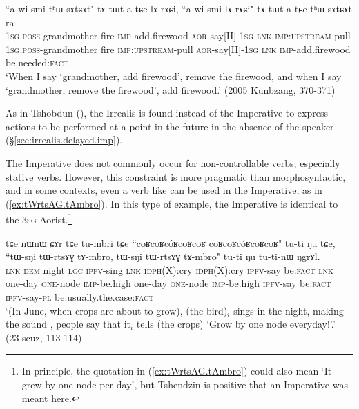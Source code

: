 \begin{exe}
\ex \label{ex:thWsAtCAt.lArACi}
\gll ``a-wi smi tʰɯ-sɤtɕɤt" tɤ-tɯt-a tɕe lɤ-rɤɕi, ``a-wi smi lɤ-rɤɕi" tɤ-tɯt-a tɕe tʰɯ-sɤtɕɤt ra \\
\textsc{1sg}.\textsc{poss}-grandmother fire \textsc{imp}-add.firewood \textsc{aor}-say[II]-\textsc{1sg} \textsc{lnk} \textsc{imp}:\textsc{upstream}-pull \textsc{1sg}.\textsc{poss}-grandmother fire \textsc{imp}:\textsc{upstream}-pull  \textsc{aor}-say[II]-\textsc{1sg} \textsc{lnk} \textsc{imp}-add.firewood be.needed:\textsc{fact} \\
\glt `When I say `grandmother, add firewood', remove the firewood, and when I say `grandmother, remove the firewood', add firewood.' (2005 Kunbzang, 370-371) 
\end{exe}

As in Tshobdun (\citealt[809]{jackson07irrealis}), the Irrealis is found instead of the Imperative to express actions to be performed at a point in the future in the absence of the speaker (§\ref{sec:irrealis.delayed.imp}). 

The Imperative does not commonly occur for non-controllable verbs, especially stative verbs. However, this constraint is more pragmatic than morphosyntactic, and in some contexts, even a verb like  can be used in the Imperative, as in (\ref{ex:tWrtsAG.tAmbro}). In this type of example, the Imperative  is identical to the \textsc{3sg} Aorist.\footnote{In principle, the quotation in (\ref{ex:tWrtsAG.tAmbro}) could also mean `It grew by one node per day', but Tshendzin is positive that an Imperative was meant here. }

\begin{exe}
\ex \label{ex:tWrtsAG.tAmbro}
\gll tɕe nɯnɯ ɕɤr tɕe tu-mbri tɕe ``coʁcoʁcóʁcoʁcoʁ coʁcoʁcóʁcoʁcoʁ" tu-ti ŋu tɕe, ``tɯ-sŋi tɯ-rtsɤɣ tɤ-mbro, tɯ-sŋi tɯ-rtsɤɣ tɤ-mbro" tu-ti ŋu tu-ti-nɯ ŋgrɤl. \\
\textsc{lnk} \textsc{dem} night \textsc{loc} \textsc{ipfv}-sing \textsc{lnk} \textsc{idph}(X):cry  \textsc{idph}(X):cry \textsc{ipfv}-say be:\textsc{fact} \textsc{lnk} one-day \textsc{one}-node \textsc{imp}-be.high one-day \textsc{one}-node \textsc{imp}-be.high \textsc{ipfv}-say be:\textsc{fact} \textsc{ipfv}-say-\textsc{pl} be.usually.the.case:\textsc{fact}  \\
\glt `(In June, when crops are about to grow), (the  bird)$_i$ sings in the night, making the sound , people say that it$_i$  tells (the crops) `Grow by one node everyday!'.' (23-scuz, 113-114)
\end{exe}

